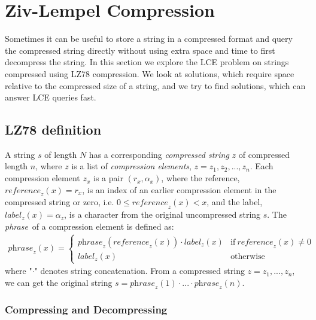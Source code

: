 \documentclass[a4]{article}
\begin{document}
\section{Ziv-Lempel Compression\label{sec:lz-compress}}

\newcommand{\zreference}{\textit{reference}}
\newcommand{\zlabel}{\textit{label}}
\newcommand{\zphrase}{\textit{phrase}}

Sometimes it can be useful to store a string in a compressed format and query the compressed string directly without using extra space and time to first decompress the string. In this section we explore the LCE problem on strings compressed using LZ78 compression. We look at solutions, which require space relative to the compressed size of a string, and we try to find solutions, which can answer LCE queries fast.

\subsection{LZ78 definition}
A string $s$ of length $N$ has a corresponding \textit{compressed string} $z$ of compressed length $n$, where $z$ is a list of \textit{compression elements}, $z = z_1, z_2, ..., z_n$. Each compression element $z_x$ is a pair $(r_x, \alpha_x)$, where the reference, $\zreference_z(x)=r_x$, is an index of an earlier compression element in the compressed string or zero, i.e. $0 \leq \zreference_z(x) < x$, and the label, $\zlabel_z(x)=\alpha_z$, is a character from the original uncompressed string $s$. The \zphrase\ of a compression element is defined as:
\begin{align*}
\zphrase_z(x) =
\begin{cases}
    \zphrase_z(\zreference_z(x)) \cdot \zlabel_z(x) & \textrm{if}~ \zreference_z(x) \neq 0\\
    \zlabel_z(x) & \textrm{otherwise}
\end{cases}
\end{align*}
where "$\cdot$" denotes string concatenation. From a compressed string $z = z_1,...,z_n$, we can get the original string $s=\zphrase_z(1)\cdot...\cdot\zphrase_z(n)$.

\subsubsection{Compressing and Decompressing\label{sec:lz-comp-alg}}
\end{document}
